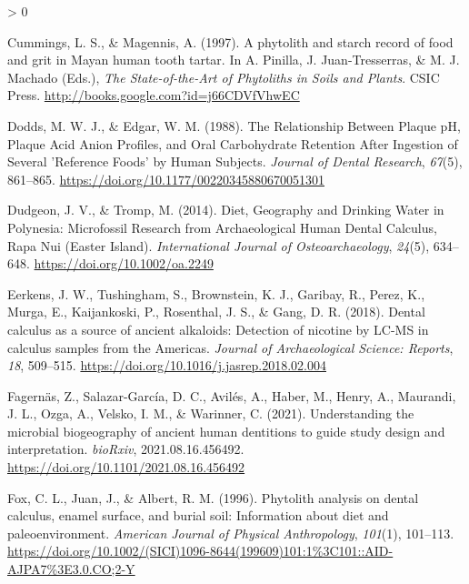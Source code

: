 \documentclass[
]{article}
\newlength{\cslhangindent}
\newenvironment{CSLReferences}[2] %
 {%
  \setlength{\parindent}{0pt}
  \ifodd #1 \everypar{\setlength{\hangindent}{\cslhangindent}}\ignorespaces\fi
  \ifnum #2 > 0
  \setlength{\parskip}{#2\baselineskip}
  \fi
 }%
 {}
\begin{document}
\begin{CSLReferences}{1}{0}
\leavevmode\hypertarget{ref-cummingsMayanCalculus1997}{}%
Cummings, L. S., \& Magennis, A. (1997). A phytolith and starch record of food and grit in {Mayan} human tooth tartar. In A. Pinilla, J. Juan-Tresserras, \& M. J. Machado (Eds.), \emph{The {State}-of-the-{Art} of {Phytoliths} in {Soils} and {Plants}}. {CSIC Press}. \url{http://books.google.com?id=j66CDVfVhwEC}

\leavevmode\hypertarget{ref-doddsCarbohydrateRetention1988}{}%
Dodds, M. W. J., \& Edgar, W. M. (1988). The {Relationship Between Plaque pH}, {Plaque Acid Anion Profiles}, and {Oral Carbohydrate Retention After Ingestion} of {Several} '{Reference Foods}' by {Human Subjects}. \emph{Journal of Dental Research}, \emph{67}(5), 861--865. \url{https://doi.org/10.1177/00220345880670051301}

\leavevmode\hypertarget{ref-dudgeonDietGeographyDrinking2014}{}%
Dudgeon, J. V., \& Tromp, M. (2014). Diet, {Geography} and {Drinking Water} in {Polynesia}: {Microfossil Research} from {Archaeological Human Dental Calculus}, {Rapa Nui} ({Easter Island}). \emph{International Journal of Osteoarchaeology}, \emph{24}(5), 634--648. \url{https://doi.org/10.1002/oa.2249}

\leavevmode\hypertarget{ref-eerkensDentalCalculusSource2018}{}%
Eerkens, J. W., Tushingham, S., Brownstein, K. J., Garibay, R., Perez, K., Murga, E., Kaijankoski, P., Rosenthal, J. S., \& Gang, D. R. (2018). Dental calculus as a source of ancient alkaloids: {Detection} of nicotine by {LC}-{MS} in calculus samples from the {Americas}. \emph{Journal of Archaeological Science: Reports}, \emph{18}, 509--515. \url{https://doi.org/10.1016/j.jasrep.2018.02.004}

\leavevmode\hypertarget{ref-fagernasMicrobialBiogeography2021}{}%
Fagernäs, Z., Salazar-García, D. C., Avilés, A., Haber, M., Henry, A., Maurandi, J. L., Ozga, A., Velsko, I. M., \& Warinner, C. (2021). Understanding the microbial biogeography of ancient human dentitions to guide study design and interpretation. \emph{bioRxiv}, 2021.08.16.456492. \url{https://doi.org/10.1101/2021.08.16.456492}

\leavevmode\hypertarget{ref-foxPhytolithCalculus1996}{}%
Fox, C. L., Juan, J., \& Albert, R. M. (1996). Phytolith analysis on dental calculus, enamel surface, and burial soil: {Information} about diet and paleoenvironment. \emph{American Journal of Physical Anthropology}, \emph{101}(1), 101--113. \url{https://doi.org/10.1002/(SICI)1096-8644(199609)101:1\%3C101::AID-AJPA7\%3E3.0.CO;2-Y}


\end{CSLReferences}
\end{document}
